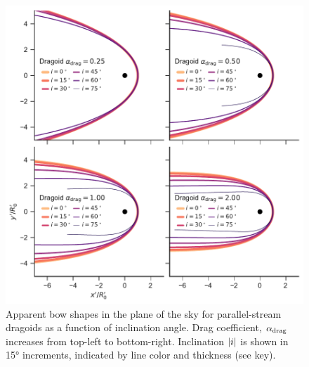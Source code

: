 \begin{figure}
  \centering
  \includegraphics[width=\linewidth]{figs/test_xyprime_dragoid}
  \caption{Apparent bow shapes in the plane of the sky for
    parallel-stream dragoids as a function of inclination angle.  Drag
    coefficient, \(\alpha_{\text{drag}}\) increases from top-left to bottom-right.
    Inclination \(\lvert i\rvert\) is shown in \ang{15} increments, indicated
    by line color and thickness (see key).}
  \label{fig:dragoid-xy-prime}
\end{figure}
